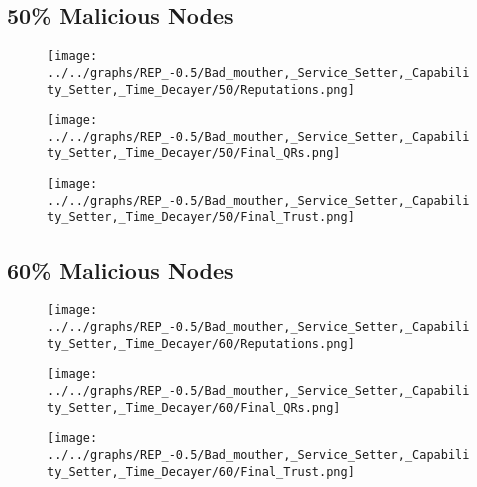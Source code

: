 \begin{minipage}[t]{0.49\columnwidth}
\subsection*{50\% Malicious Nodes}
    \begin{figure}[H]
        \centering
        \texttt{[image: ../../graphs/REP\_-0.5/Bad\_mouther,\_Service\_Setter,\_Capability\_Setter,\_Time\_Decayer/50/Reputations.png]}
    \end{figure}
    \begin{figure}[H]
        \centering
        \texttt{[image: ../../graphs/REP\_-0.5/Bad\_mouther,\_Service\_Setter,\_Capability\_Setter,\_Time\_Decayer/50/Final\_QRs.png]}
    \end{figure}
\end{minipage}
\begin{minipage}[t]{0.49\columnwidth}
    \begin{figure}[H]
        \centering
        \texttt{[image: ../../graphs/REP\_-0.5/Bad\_mouther,\_Service\_Setter,\_Capability\_Setter,\_Time\_Decayer/50/Final\_Trust.png]}
    \end{figure}
\end{minipage}

\begin{minipage}[t]{0.49\columnwidth}
\subsection*{60\% Malicious Nodes}
    \begin{figure}[H]
        \centering
        \texttt{[image: ../../graphs/REP\_-0.5/Bad\_mouther,\_Service\_Setter,\_Capability\_Setter,\_Time\_Decayer/60/Reputations.png]}
    \end{figure}
    \begin{figure}[H]
        \centering
        \texttt{[image: ../../graphs/REP\_-0.5/Bad\_mouther,\_Service\_Setter,\_Capability\_Setter,\_Time\_Decayer/60/Final\_QRs.png]}
    \end{figure}
\end{minipage}
\begin{minipage}[t]{0.49\columnwidth}
    \begin{figure}[H]
        \centering
        \texttt{[image: ../../graphs/REP\_-0.5/Bad\_mouther,\_Service\_Setter,\_Capability\_Setter,\_Time\_Decayer/60/Final\_Trust.png]}
    \end{figure}
\end{minipage}

